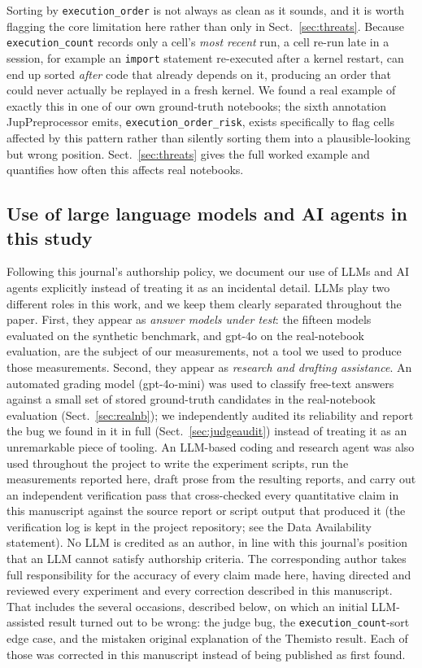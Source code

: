 \documentclass[11pt]{article}
\begin{document}
Sorting by \texttt{execution\_order} is not always as clean as it
sounds, and it is worth flagging the core limitation here rather than
only in Sect.~\ref{sec:threats}. Because \texttt{execution\_count} records
only a cell's \emph{most recent} run, a cell re-run late in a session,
for example an \texttt{import} statement re-executed after a kernel
restart, can end up sorted \emph{after} code that already depends on it,
producing an order that could never actually be replayed in a fresh
kernel. We found a real example of exactly this in one of our own
ground-truth notebooks; the sixth annotation JupPreprocessor emits,
\texttt{execution\_order\_risk}, exists specifically to flag cells
affected by this pattern rather than silently sorting them into a
plausible-looking but wrong position. Sect.~\ref{sec:threats} gives the
full worked example and quantifies how often this affects real
notebooks.

\subsection{Use of large language models and AI agents in this study}
\label{sec:llmuse}
Following this journal's authorship policy, we document our use of LLMs
and AI agents explicitly instead of treating it as an incidental detail.
LLMs play two different roles in this work, and we keep them clearly
separated throughout the paper. First, they appear as \emph{answer models
under test}: the fifteen models evaluated on the synthetic benchmark, and
gpt-4o on the real-notebook evaluation, are the subject of our
measurements, not a tool we used to produce those measurements. Second,
they appear as \emph{research and drafting assistance}. An automated
grading model (gpt-4o-mini) was used to classify free-text answers
against a small set of stored ground-truth candidates in the
real-notebook evaluation (Sect.~\ref{sec:realnb}); we independently
audited its reliability and report the bug we found in it in full
(Sect.~\ref{sec:judgeaudit}) instead of treating it as an unremarkable
piece of tooling. An LLM-based coding and research agent was also used
throughout the project to write the experiment scripts, run the
measurements reported here, draft prose from the resulting reports, and
carry out an independent verification pass that cross-checked every
quantitative claim in this manuscript against the source report or script
output that produced it (the verification log is kept in the project
repository; see the Data Availability statement). No LLM is credited as
an author, in line with this journal's position that an LLM cannot
satisfy authorship criteria. The corresponding author takes full
responsibility for the accuracy of every claim made here, having directed
and reviewed every experiment and every correction described in this
manuscript. That includes the several occasions, described below, on
which an initial LLM-assisted result turned out to be wrong: the judge
bug, the \texttt{execution\_count}-sort edge case, and the mistaken
original explanation of the Themisto result. Each of those was corrected
in this manuscript instead of being published as first found.
\end{document}
